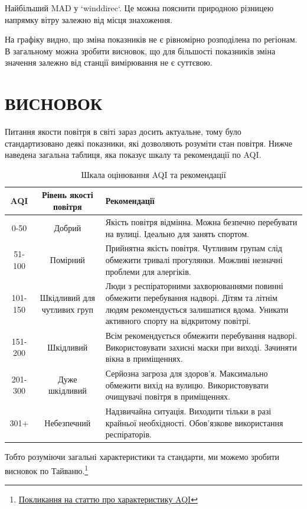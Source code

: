 \documentclass{article}
\begin{document}
\begin{enumerate}
\begin{center}
    \end{center}
    Найбільший MAD у `winddirec`. Це можна пояснити природною різницею напрямку вітру залежно від місця знахоження.

    На графіку видно, що зміна показників не є рівномірно розподілена по регіонам. В загальному можна зробити висновок, що для більшості 
показників зміна значення залежно від станції вимірювання не є суттєвою.
\end{enumerate}

\pagebreak

\newpage
\section{ВИСНОВОК}
Питання якости повітря в світі зараз досить актуальне, тому було стандартизовано деякі показники, які дозволяють розуміти стан повітря.
Нижче наведена загальна таблиця, яка показує шкалу та рекомендації по AQI.
\begin{table}
    \centering
    \renewcommand{\arraystretch}{1.3}
    \setlength{\arrayrulewidth}{1pt}
    \begin{tabular}{|c|c|p{8cm}|}
        \hline
        \rowcolor{gray!20} \textbf{AQI} & \textbf{Рівень якості повітря} & \textbf{Рекомендації} \\
        \hline
        \rowcolor{green!40} 0-50 & Добрий & Якість повітря відмінна. Можна безпечно перебувати на вулиці. Ідеально для занять спортом. \\
        \hline
        \rowcolor{yellow!40} 51-100 & Помірний & Прийнятна якість повітря. Чутливим групам слід обмежити тривалі прогулянки. Можливі незначні проблеми для алергіків. \\
        \hline
        \rowcolor{orange!60} 101-150 & Шкідливий для чутливих груп & Люди з респіраторними захворюваннями повинні обмежити перебування надворі. Дітям та літнім людям рекомендується залишатися вдома. Уникати активного спорту на відкритому повітрі. \\
        \hline
        \rowcolor{red!60} 151-200 & Шкідливий & Всім рекомендується обмежити перебування надворі. Використовувати захисні маски при виході. Зачиняти вікна в приміщеннях. \\
        \hline
        \rowcolor{purple!50} 201-300 & Дуже шкідливий & Серйозна загроза для здоров’я. Максимально обмежити вихід на вулицю. Використовувати очищувачі повітря в приміщеннях. \\
        \hline
        \rowcolor{black!40} 301+ & Небезпечний & Надзвичайна ситуація. Виходити тільки в разі крайньої необхідності. Обов’язкове використання респіраторів. \\
        \hline
    \end{tabular}
    \caption{Шкала оцінювання AQI та рекомендації}
    \label{tab:AQI_scale}
\end{table}
Тобто розуміючи загальні характеристики та стандарти, ми можемо зробити висновок по Тайваню.\footnote{\href{https://center-ltd.com.ua/novyny/normy-indeksu-yakosti-povitrya-yak-rozumity-pokaznyky-ta-zahystyty-svoye-zdorov-ya/}{Покликання на статтю про характеристику AQI}}
\end{document}

